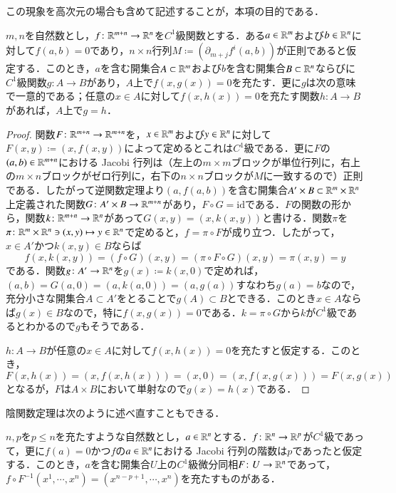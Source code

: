 この現象を高次元の場合も含めて記述することが，本項の目的である．

\begin{thm}[陰関数定理]$m,n$を自然数とし，$f \colon \mathbb{R}^{m+n} \to \mathbb{R}^n$を$C^1$級関数とする．ある$a \in \mathbb{R}^m$および$b \in \mathbb{R}^n$に対して$f(a,b)=0$であり，$n \times n$行列$M \coloneqq (\partial_{m+j} f^i (a,b))$が正則であると仮定する．このとき，$a$を含む開集合$A \subset \mathbb{R}^m$および$b$を含む開集合$B \subset \mathbb{R}^n$ならびに$C^1$級関数$g \colon A \to B$があり，$A$上で$f(x,g(x))=0$を充たす．更に$g$は次の意味で一意的である；任意の$x \in A$に対して$f(x,h(x))=0$を充たす関数$h \colon A \to B$があれば，$A$上で$g=h$．
\end{thm}

\begin{proof}
関数$F \colon \mathbb{R}^{m+n} \to \mathbb{R}^{m+n}$を，$x\in \mathbb{R}^m$および$y \in \mathbb{R}^n$に対して$F(x,y) \coloneqq (x,f(x,y))$によって定めるとこれは$C^1級$である．更に$F$の$(a,b) \in \mathbb{R}^{m+n}$における Jacobi 行列は（左上の$m \times m$ブロックが単位行列に，右上の$m \times n$ブロックがゼロ行列に，右下の$n \times n$ブロックが$M$に一致するので）正則である．したがって逆関数定理より$(a,f(a,b))$を含む開集合$A' \times B \subset \mathbb{R}^m \times \mathbb{R}^n$上定義された関数$G \colon A' \times B \to \mathbb{R}^{m+n}$があり，$F \circ G = \mathrm{id}$である．$F$の関数の形から，関数$k \colon \mathbb{R}^{m+n} \to \mathbb{R}^n$があって$G(x,y) = (x,k(x,y))$と書ける．関数$\pi$を$\pi \colon \mathbb{R}^m \times \mathbb{R}^n \ni (x,y) \mapsto y \in \mathbb{R}^n$で定めると，$f = \pi \circ F$が成り立つ．したがって，$x \in A'$かつ$k(x,y) \in B$ならば
\begin{equation}
f(x,k(x,y)) = (f \circ G)(x,y) = (\pi \circ F \circ G)(x,y) = \pi (x,y) = y
\end{equation}である．関数$g \colon A' \to \mathbb{R}^n$を$g(x) \coloneqq k(x,0)$で定めれば，$(a,b)=G(a,0)=(a,k(a,0))=(a,g(a))$すなわち$g(a)=b$なので，充分小さな開集合$A \subset A'$をとることで$g(A) \subset B$とできる．このとき$x \in A$ならば$g(x) \in B$なので，特に$f(x,g(x))=0$である．$k = \pi \circ G$から$k$が$C^1$級であるとわかるので$g$もそうである．

$h \colon A \to B$が任意の$x \in A$に対して$f(x,h(x))=0$を充たすと仮定する．このとき，$F(x,h(x)) = (x,f(x,h(x))) = (x,0) = (x,f(x,g(x))) = F(x,g(x))$となるが，$F$は$A \times B$において単射なので$g(x)=h(x)$である．
\end{proof}

陰関数定理は次のように述べ直すこともできる．

\begin{thm}
$n,p$を$p \leq n$を充たすような自然数とし，$a \in \mathbb{R}^n$とする．$f \colon \mathbb{R}^n \to \mathbb{R}^p$が$C^1$級であって，更に$f(a) = 0$かつ$f$の$a \in \mathbb{R}^n$における Jacobi 行列の階数は$p$であったと仮定する．このとき，$a$を含む開集合$U$上の$C^1$級微分同相$F \colon U \to \mathbb{R}^n$であって，$f \circ F^{-1} (x^1, \cdots, x^n) = (x^{n-p +1}, \cdots, x^n)$を充たすものがある．
\end{thm}


